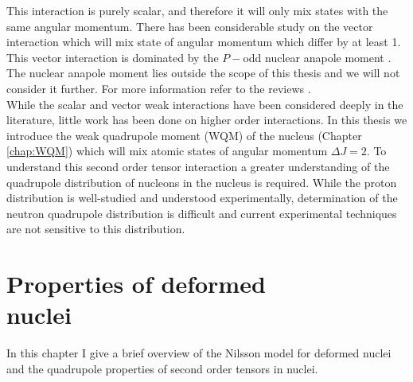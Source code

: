 \documentclass[10pt,a4paper, twoside, openright]{report}
\begin{document}
This interaction is purely scalar, and therefore it will only mix states with the same angular momentum. There has been considerable study on the vector interaction which will mix state of angular momentum which differ by at least 1. This vector interaction is dominated by the $P-$odd nuclear anapole moment \cite{GingesReview}. The nuclear anapole moment lies outside the scope of this thesis and we will not consider it further. For more information refer to the reviews \cite{GingesReview, Roberts2015, KhriplovichPNC}. \\
\linebreak
While the scalar and vector weak interactions have been considered deeply in the literature, little work has been done on higher order interactions. In this thesis we introduce the weak quadrupole moment (WQM) of the nucleus (Chapter \ref{chap:WQM}) which will mix atomic states of angular momentum $\Delta J = 2$. To understand this second order tensor interaction a greater understanding of the quadrupole distribution of nucleons in the nucleus is required. While the proton distribution is well-studied and understood experimentally, determination of the neutron quadrupole distribution is difficult and current experimental techniques are not sensitive to this distribution.  
\chapter[Properties of deformed nuclei]{Properties of deformed \\ nuclei} \label{chap:Deformed}
 In this chapter I give a brief overview of the Nilsson model for deformed nuclei and the quadrupole properties of second order tensors in nuclei.
\end{document}
